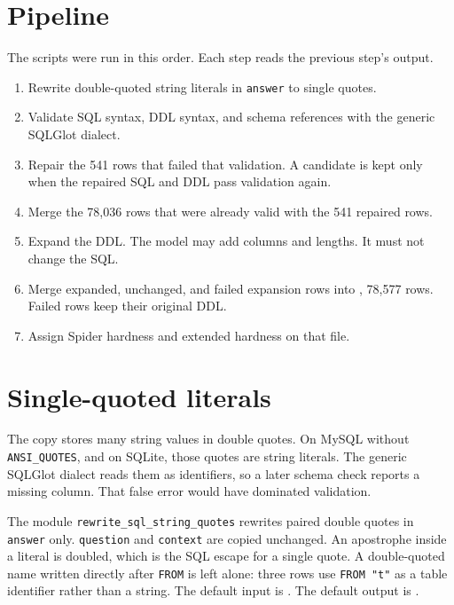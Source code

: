 \documentclass[11pt,a4paper]{article}
\begin{document}
\section{Pipeline}

The scripts were run in this order. Each step reads the previous step's output.

\begin{enumerate}
  \item Rewrite double-quoted string literals in \texttt{answer} to single quotes.
  \item Validate SQL syntax, DDL syntax, and schema references with the generic
        SQLGlot dialect.
  \item Repair the 541 rows that failed that validation. A candidate is kept
        only when the repaired SQL and DDL pass validation again.
  \item Merge the 78{,}036 rows that were already valid with the 541 repaired
        rows.
  \item Expand the DDL. The model may add columns and lengths. It must not
        change the SQL.
  \item Merge expanded, unchanged, and failed expansion rows into
        , 78{,}577 rows. Failed rows keep
        their original DDL.
  \item Assign Spider hardness and extended hardness on that file.
\end{enumerate}

\section{Single-quoted literals}
\label{sec:quotes}

The copy stores many string values in double quotes. On MySQL without
\texttt{ANSI\_QUOTES}, and on SQLite, those quotes are string literals. The
generic SQLGlot dialect reads them as identifiers, so a later schema check
reports a missing column. That false error would have dominated validation.

The module \texttt{rewrite\_sql\_string\_quotes} rewrites paired double quotes
in \texttt{answer} only.
\texttt{question} and \texttt{context} are copied unchanged. An apostrophe
inside a literal is doubled, which is the SQL escape for a single quote. A
double-quoted name written directly after \texttt{FROM} is left alone: three
rows use \texttt{FROM "t"} as a table identifier rather than a string. The
default input is . The default output is
.
\end{document}
